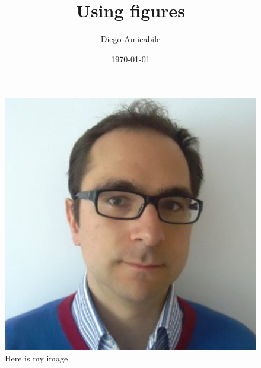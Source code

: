 \documentclass[a4paper,12pt]{article}
\begin{document}
\title{Using figures}
\author{Diego Amicabile}
\date{\today}
\maketitle

\begin{figure}[h]
\centering
\includegraphics[width=1\textwidth]{diego}
\caption{Here is my image}
\label{image-myimage}
\end{figure}
\end{document}
